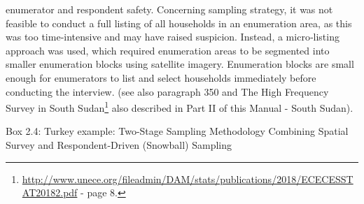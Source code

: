 \documentclass[
]{article}
\begin{document}
\begin{enumerate}
  enumerator and respondent safety. Concerning sampling strategy, it
  was not feasible to conduct a full listing of all households in an
  enumeration area, as this was too time‐intensive and may have raised
  suspicion. Instead, a micro‐listing approach was used, which
  required enumeration areas to be segmented into smaller enumeration
  blocks using satellite imagery. Enumeration blocks are small enough
  for enumerators to list and select households immediately before
  conducting the interview. (see also paragraph 350 and The High
  Frequency Survey in South Sudan\footnote{\url{http://www.unece.org/fileadmin/DAM/stats/publications/2018/ECECESSTAT20182.pdf}
    - page 8.} also described in Part II of
  this Manual - South Sudan).
\end{enumerate}

Box 2.4: Turkey example: Two-Stage Sampling Methodology Combining
Spatial Survey and Respondent-Driven (Snowball) Sampling
\end{document}
